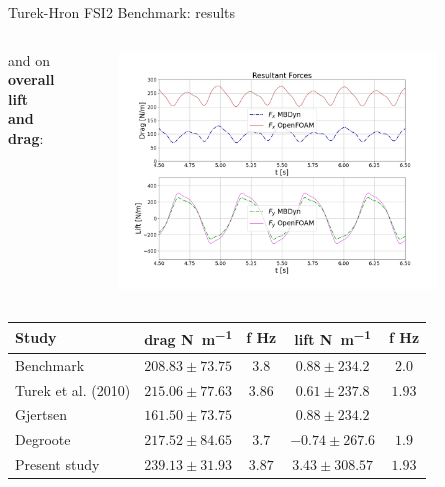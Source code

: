 \documentclass[10pt,t]{beamer}
\begin{document}
\begin{frame}{Turek-Hron FSI2 Benchmark: results}

\begin{columns}

and on\\ \textbf{overall lift and drag}:



\vspace{-1cm}

\begin{figure}[htbp!]
	\centering
	\includegraphics[width=0.9\textwidth, trim=20 40 20 20, clip]{images/FSI2/forces_fsi2_pres.png}
\end{figure}

\end{columns}

\footnotesize
\begin{center}
\begin{tabular}{ l | c c | c c  |  } 
	Study & drag \si{N.m^{-1}} & f \si{Hz} & lift \si{N.m^{-1}} & f \si{Hz}    \\ 
	\hline
	\hline
	Benchmark & $208.83\pm73.75$ & $3.8$ & $0.88\pm234.2$ & $2.0$     \\
	Turek et al. (2010) & $215.06\pm77.63$ & $3.86$ & $0.61\pm237.8$ & $1.93$\\   
	Gjertsen & $161.50\pm73.75$ & & $0.88\pm234.2$ & \\
	Degroote  & $217.52\pm84.65$ & $3.7$ & $-0.74\pm267.6$ & $1.9$ \\
	\hline
	Present study & $239.13\pm31.93$ & $3.87$ & $3.43\pm308.57$ & $1.93$ \\
\end{tabular}
    
\end{center}

\end{frame}
\end{document}
